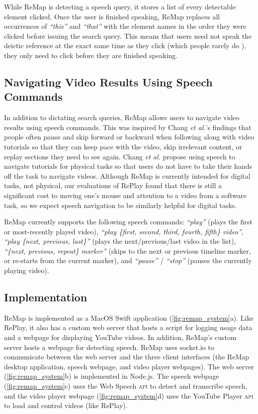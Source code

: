 While ReMap is detecting a speech query, it stores a list of every detectable element clicked. Once the user is finished speaking, ReMap replaces all occurrences of \textit{``this''} and \textit{``that''} with the element names in the order they were clicked before issuing the search query. This means that users need not speak the deictic reference at the exact same time as they click (which people rarely do \cite{Oviatt1999}), they only need to click before they are finished speaking.

\subsection{Navigating Video Results Using Speech Commands}
In addition to dictating search queries, ReMap allows users to navigate video results using speech commands. This was inspired by  Chang \textit{et al.}'s \cite{Chang2019} findings that  people often pause and skip forward or backward when following along with video tutorials so that they can keep pace with the video, skip irrelevant content, or replay sections they need to see again. Chang \textit{et al.} \cite{Chang2019} propose using speech to navigate tutorials for physical tasks so that users do not have to take their hands off the task to navigate videos. Although ReMap is currently intended for digital tasks, not physical, our evaluations of RePlay found that there is still a significant cost to moving one's mouse and attention to a video from a software task, so we expect speech navigation to be similarly helpful for digital tasks. 

ReMap currently supports the following speech commands: \textit{``play''} (plays the first or most-recently played video), \textit{``play \{first, second, third, fourth, fifth\} video''}, \textit{``play \{next, previous, last\}''} (plays the next/previous/last video in the list), \textit{``\{next, previous, repeat\} marker''} (skips to the next or previous timeline marker, or re-starts from the current marker), and \textit{``pause''} / \textit{``stop''} (pauses the currently playing video).


\subsection{Implementation}
\label{sec:remap_implementation}
ReMap is implemented as a MacOS Swift application (\autoref{fig:remap_system}a). Like RePlay, it also has a custom web server that hosts a script for logging usage data and a webpage for displaying YouTube videos. In addition, ReMap's custom server hosts a webpage for detecting speech. ReMap uses socket.io to communicate between the web server and the three client interfaces (the ReMap desktop application, speech webpage, and video player webpages). The web server (\autoref{fig:remap_system}b) is implemented in Node.js. The speech webpage (\autoref{fig:remap_system}c) uses the Web Speech \textsc{api} to detect and transcribe speech, and the video player webpage (\autoref{fig:remap_system}d) uses the YouTube Player \textsc{api} to load and control videos (like RePlay). %

